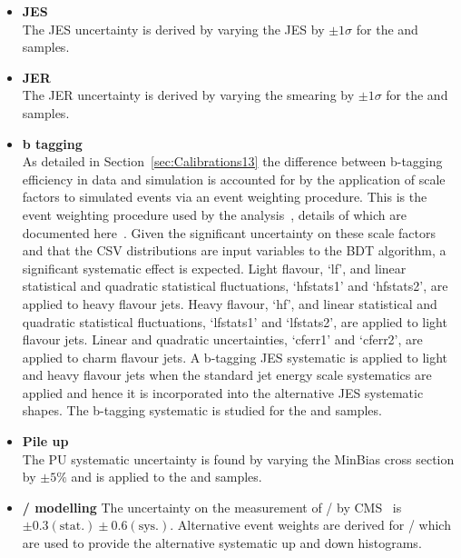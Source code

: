 \begin{itemize}
\item \textbf{JES}\\
The JES uncertainty is derived by varying the JES by $\pm1\sigma$ for the \ttbar and \tttt samples.
\item \textbf{JER}\\
The JER uncertainty is derived by varying the smearing by $\pm1\sigma$ for the \ttbar and \tttt samples.
\item \textbf{b tagging}\\
As detailed in Section~\ref{sec:Calibrations13} the difference between b-tagging efficiency in data and simulation is accounted for by the application of scale factors to simulated events via an event weighting procedure. This is the event weighting procedure used by the \ttH analysis~\cite{CMS-PAS-HIG-16-004}, details of which are documented here~\cite{CMS-NOTE-2013-130}. Given the significant uncertainty on these scale factors and that the CSV distributions are input variables to the BDT algorithm, a significant systematic effect is expected. Light flavour, `lf', and linear statistical and quadratic statistical fluctuations, `hfstats1' and `hfstats2', are applied to heavy flavour jets.  Heavy flavour, `hf', and linear statistical and quadratic statistical fluctuations, `lfstats1' and `lfstats2', are applied to light flavour jets. Linear and quadratic uncertainties, `cferr1' and `cferr2', are applied to charm flavour jets. A b-tagging JES systematic is applied to light and heavy flavour jets when the standard jet energy scale systematics are applied and hence it is incorporated into the alternative JES systematic shapes. The b-tagging systematic is studied for the \ttbar and \tttt samples.
\item \textbf{Pile up}\\
The PU systematic uncertainty is found by varying the MinBias cross section by $\pm5\%$ and is applied to the \ttbar and \tttt samples.
\item \textbf{\heavyflavourone / \heavyflavourtwo modelling}
The uncertainty on the measurement of \heavyflavourone / \heavyflavourtwo by CMS~\cite{Khachatryan2015132} is $\pm 0.3 \left( \textrm{stat.} \right) \pm 0.6 \left(\textrm{sys.} \right)$. Alternative event weights are derived for \heavyflavourone / \heavyflavourtwo which are used to provide the alternative systematic up and down histograms.
\end{itemize}
